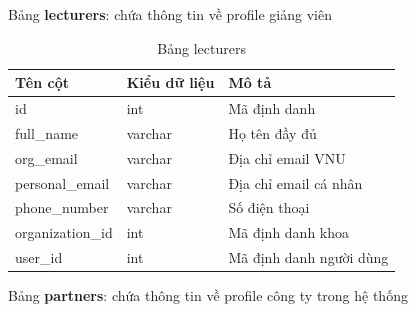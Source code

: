 \documentclass[./../main.tex]{subfiles}
\begin{document}
Bảng \textbf{lecturers}: chứa thông tin về profile giảng viên

\begin{table}[H]
	\caption{Bảng lecturers}
	\label{tab:db_lecturers}
	\begin{tabular}{|l|l|l|}
	\hline
	\textbf{Tên cột} & \textbf{Kiểu dữ liệu} & \textbf{Mô tả}          \\ \hline
	id               & int                   & Mã định danh            \\ \hline
	full\_name       & varchar               & Họ tên đầy đủ           \\ \hline
	org\_email       & varchar               & Địa chỉ email VNU       \\ \hline
	personal\_email  & varchar               & Địa chỉ email cá nhân   \\ \hline
	phone\_number    & varchar               & Số điện thoại           \\ \hline
	organization\_id & int                   & Mã định danh khoa       \\ \hline
	user\_id         & int                   & Mã định danh người dùng \\ \hline
	\end{tabular}%
\end{table}

Bảng \textbf{partners}: chứa thông tin về profile công ty trong hệ thống
\end{document}
